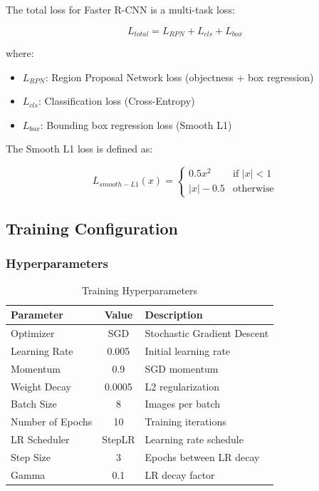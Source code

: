 \documentclass[12pt,a4paper]{article}
\begin{document}
The total loss for Faster R-CNN is a multi-task loss:

\begin{equation}
    L_{total} = L_{RPN} + L_{cls} + L_{box}
\end{equation}

where:

\begin{itemize}
    \item $L_{RPN}$: Region Proposal Network loss (objectness + box regression)
    \item $L_{cls}$: Classification loss (Cross-Entropy)
    \item $L_{box}$: Bounding box regression loss (Smooth L1)
\end{itemize}

The Smooth L1 loss is defined as:

\begin{equation}
    L_{smooth-L1}(x) = \begin{cases}
        0.5x^2 & \text{if } |x| < 1 \\
        |x| - 0.5 & \text{otherwise}
    \end{cases}
\end{equation}

\subsection{Training Configuration}

\subsubsection{Hyperparameters}

\begin{table}[H]
    \centering
    \caption{Training Hyperparameters}
    \label{tab:hyperparams}
    \begin{tabular}{|l|c|l|}
        \hline
        \textbf{Parameter} & \textbf{Value} & \textbf{Description} \\
        \hline
        Optimizer & SGD & Stochastic Gradient Descent \\
        Learning Rate & 0.005 & Initial learning rate \\
        Momentum & 0.9 & SGD momentum \\
        Weight Decay & 0.0005 & L2 regularization \\
        Batch Size & 8 & Images per batch \\
        Number of Epochs & 10 & Training iterations \\
        LR Scheduler & StepLR & Learning rate schedule \\
        Step Size & 3 & Epochs between LR decay \\
        Gamma & 0.1 & LR decay factor \\
        \hline
    \end{tabular}
\end{table}
\end{document}
